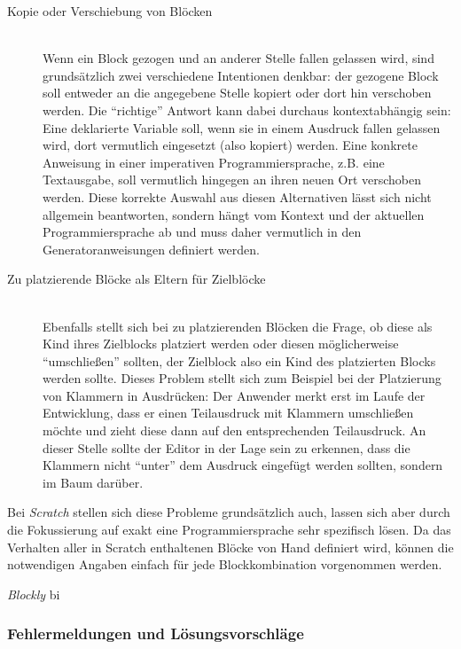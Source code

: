 \documentclass[paper=a4,fontsize=11pt,parskip=half]{scrartcl}
\begin{document}
\begin{description}
\item[Kopie oder Verschiebung von Blöcken] \hfill\\
  Wenn ein Block gezogen und an anderer Stelle fallen gelassen wird, sind grundsätzlich zwei verschiedene Intentionen denkbar: der gezogene Block soll entweder an die angegebene Stelle kopiert oder dort hin verschoben werden. Die \enquote{richtige} Antwort kann dabei durchaus kontextabhängig sein: Eine deklarierte Variable soll, wenn sie in einem Ausdruck fallen gelassen wird, dort vermutlich eingesetzt (also kopiert) werden. Eine konkrete Anweisung in einer imperativen Programmiersprache, z.B. eine Textausgabe, soll vermutlich hingegen an ihren neuen Ort verschoben werden. Diese korrekte Auswahl aus diesen Alternativen lässt sich nicht allgemein beantworten, sondern hängt vom Kontext und der aktuellen Programmiersprache ab und muss daher vermutlich in den Generatoranweisungen definiert werden.
\item[Zu platzierende Blöcke als Eltern für Zielblöcke] \hfill\\
  Ebenfalls stellt sich bei zu platzierenden Blöcken die Frage, ob diese als Kind ihres Zielblocks platziert werden oder diesen möglicherweise \enquote{umschließen} sollten, der Zielblock also ein Kind des platzierten Blocks werden sollte. Dieses Problem stellt sich zum Beispiel bei der Platzierung von Klammern in Ausdrücken: Der Anwender merkt erst im Laufe der Entwicklung, dass er einen Teilausdruck mit Klammern umschließen möchte und zieht diese dann auf den entsprechenden Teilausdruck. An dieser Stelle sollte der Editor in der Lage sein zu erkennen, dass die Klammern nicht \enquote{unter} dem Ausdruck eingefügt werden sollten, sondern im Baum darüber.
\end{description}

Bei \textit{Scratch} stellen sich diese Probleme grundsätzlich auch, lassen sich aber durch die Fokussierung auf exakt eine Programmiersprache sehr spezifisch lösen. Da das Verhalten aller in Scratch enthaltenen Blöcke von Hand definiert wird, können die notwendigen Angaben einfach für jede Blockkombination vorgenommen werden.

\textit{Blockly} bi


\subsubsection{Fehlermeldungen und Lösungsvorschläge}
\end{document}
